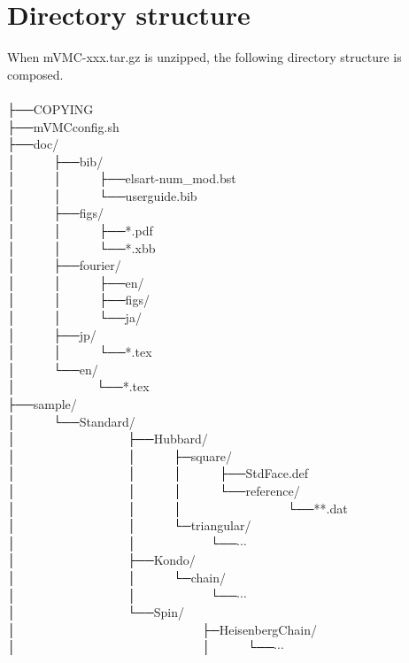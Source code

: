 \label{Sec:HowToInstall}

\section{Directory structure}
When mVMC-xxx.tar.gz is unzipped, the following directory structure is composed.\\
\\
├──COPYING\\
├──mVMCconfig.sh\\
├──doc/\\
│~~~~~~├──bib/\\
│~~~~~~│~~~~~~├──elsart-num\_mod.bst\\
│~~~~~~│~~~~~~└──userguide.bib\\
│~~~~~~├──figs/\\
│~~~~~~│~~~~~~├──*.pdf\\
│~~~~~~│~~~~~~└──*.xbb\\
│~~~~~~├──fourier/\\
│~~~~~~│~~~~~~├──en/\\
│~~~~~~│~~~~~~├──figs/\\
│~~~~~~│~~~~~~└──ja/\\
│~~~~~~├──jp/\\
│~~~~~~│~~~~~~└──*.tex\\
│~~~~~~└──en/\\
│~~~~~~~~~~~~~└──*.tex\\
├──sample/\\
│~~~~~~└──Standard/\\
│~~~~~~~~~~~~~~~~~~├──Hubbard/\\
│~~~~~~~~~~~~~~~~~~│~~~~~~├─square/\\
│~~~~~~~~~~~~~~~~~~│~~~~~~│~~~~~~├──StdFace.def\\
│~~~~~~~~~~~~~~~~~~│~~~~~~│~~~~~~└──reference/\\
│~~~~~~~~~~~~~~~~~~│~~~~~~│~~~~~~~~~~~~~~~~~└──**.dat\\
│~~~~~~~~~~~~~~~~~~│~~~~~~└─triangular/\\
│~~~~~~~~~~~~~~~~~~│~~~~~~~~~~~~└──$\cdots$\\
│~~~~~~~~~~~~~~~~~~├──Kondo/\\
│~~~~~~~~~~~~~~~~~~│~~~~~~└─chain/\\
│~~~~~~~~~~~~~~~~~~│~~~~~~~~~~~~└──$\cdots$\\
│~~~~~~~~~~~~~~~~~~└──Spin/\\
│~~~~~~~~~~~~~~~~~~~~~~~~~~~~~~├─HeisenbergChain/\\
│~~~~~~~~~~~~~~~~~~~~~~~~~~~~~~│~~~~~~└──$\cdots$\\
